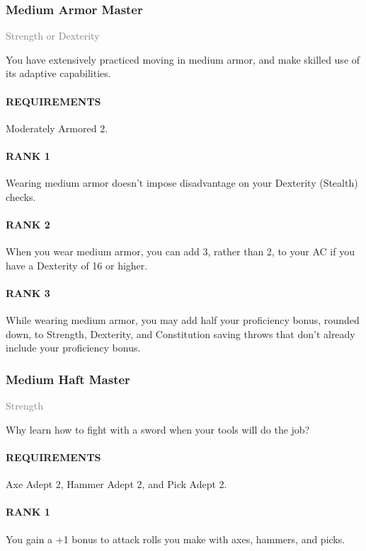 \subsubsection{Medium Armor Master} \label{feat::mediumarmormaster}
\small{\textcolor{gray}{Strength or Dexterity}}

\normalsize
You have extensively practiced moving in medium armor, and make skilled use of its adaptive capabilities.
\paragraph{REQUIREMENTS} Moderately Armored 2.
\paragraph{RANK 1} Wearing medium armor doesn't impose disadvantage on your Dexterity (Stealth) checks.
\paragraph{RANK 2} When you wear medium armor, you can add 3, rather than 2, to your AC if you have a Dexterity of 16 or higher.
\paragraph{RANK 3} While wearing medium armor, you may add half your proficiency bonus, rounded down, to Strength, Dexterity, and Constitution saving throws that don't already include your proficiency bonus.

\subsubsection{Medium Haft Master} \label{feat::mediumhaftmaster}
\small{\textcolor{gray}{Strength}}

\normalsize
Why learn how to fight with a sword when your tools will do the job?
\paragraph{REQUIREMENTS} Axe Adept 2, Hammer Adept 2, and Pick Adept 2.
\paragraph{RANK 1} You gain a +1 bonus to attack rolls you make with axes, hammers, and picks.
